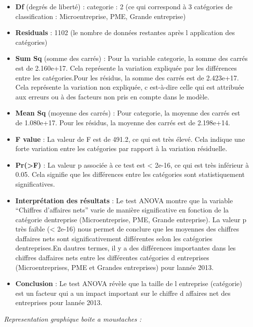 \documentclass[mstat,12pt]{unswthesis}
\begin{document}
\begin{itemize}
\item
  \textbf{Df} (degrés de liberté) : categorie : 2 (ce qui correspond à 3
  catégories de classification : Microentreprise, PME, Grande
  entreprise)
\item
  \textbf{Residuals} : 1102 (le nombre de données restantes après l
  application des catégories)
\item
  \textbf{Sum Sq} (somme des carrés) : Pour la variable categorie, la
  somme des carrés est de 2.160e+17. Cela représente la variation
  expliquée par les différences entre les catégories.Pour les résidus,
  la somme des carrés est de 2.423e+17. Cela représente la variation non
  expliquée, c est-à-dire celle qui est attribuée aux erreurs ou à des
  facteurs non pris en compte dans le modèle.
\item
  \textbf{Mean Sq} (moyenne des carrés) : Pour categorie, la moyenne des
  carrés est de 1.080e+17. Pour les résidus, la moyenne des carrés est
  de 2.198e+14.
\item
  \textbf{F value} : La valeur de F est de 491.2, ce qui est très élevé.
  Cela indique une forte variation entre les catégories par rapport à la
  variation résiduelle.
\item
  \textbf{Pr(\textgreater F)} : La valeur p associée à ce test est
  \textless{} 2e-16, ce qui est très inférieur à 0.05. Cela signifie que
  les différences entre les catégories sont statistiquement
  significatives.
\item
  \textbf{Interprétation des résultats} : Le test ANOVA montre que la
  variable ``Chiffres d'affaires nets'' varie de manière significative
  en fonction de la catégorie dentreprise (Microentreprise, PME, Grande
  entreprise). La valeur p très faible (\textless{} 2e-16) nous permet
  de conclure que les moyennes des chiffres daffaires nets sont
  significativement différentes selon les catégories dentreprises.En
  dautres termes, il y a des différences importantes dans les chiffres
  daffaires nets entre les différentes catégories d entreprises
  (Microentreprises, PME et Grandes entreprises) pour lannée 2013.
\item
  \textbf{Conclusion} : Le test ANOVA révèle que la taille de l
  entreprise (catégorie) est un facteur qui a un impact important sur le
  chiffre d affaires net des entreprises pour lannée 2013.
\end{itemize}

\newpage

\emph{Representation graphique boite a moustaches : }
\end{document}
